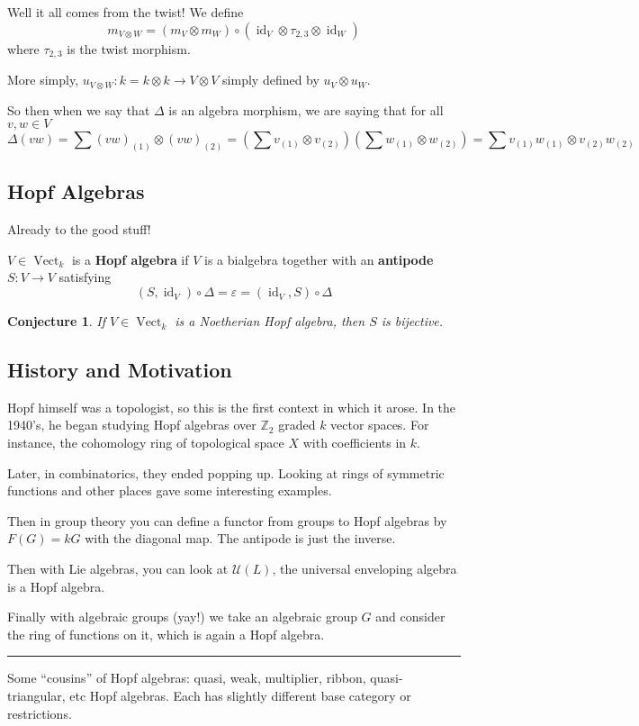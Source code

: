 \documentclass[12pt]{article}
\theoremstyle{break}
\theoremstyle{nonumberbreak}
\theoremstyle{changebreak}
\theoremstyle{break}
\theoremstyle{nonumberbreak}
\theoremstyle{nonumberplain}
\newtheorem{conj}{Conjecture}
\theoremstyle{change}
\newcommand*{\Z}{
\mathbb{Z}
}
\newcommand*{\brk}{
\rule{2in}{.1pt}
}
\DeclareMathOperator{\id}{id}
\newcommand*{\Vectk}{\operatorname{Vect}_k}
\begin{document}
Well it all comes from the twist! We define
\[m_{V\otimes W}=(m_V\otimes m_W)\circ(\id_V\otimes \tau_{2,3}\otimes \id_W)\]
where $\tau_{2,3}$ is the twist morphism.

More simply, $u_{V\otimes W}:k=k\otimes k\to V\otimes V$ simply defined by $u_V\otimes u_W$.

So then when we say that $\Delta$ is an algebra morphism, we are saying that for all $v,w\in V$
\[\Delta(vw)=\sum(vw)_{(1)}\otimes(vw)_{(2)}=(\sum v_{(1)}\otimes v_{(2)})(\sum w_{(1)}\otimes w_{(2)})=\sum v_{(1)}w_{(1)}\otimes v_{(2)}w_{(2)}\]

\subsection{Hopf Algebras}
Already to the good stuff!
\begin{defn}
	$V\in\Vectk$ is a \textbf{Hopf algebra} if $V$ is a bialgebra together with an \textbf{antipode}
	$S:V\to V$ satisfying
	\[(S,\id_V)\circ \Delta=\varepsilon=(\id_V,S)\circ\Delta\]
\end{defn}
\begin{conj}
	If $V\in\Vectk$ is a Noetherian Hopf algebra, then $S$ is bijective.
\end{conj}

\subsection{History and Motivation}
Hopf himself was a topologist, so this is the first context in which it arose. In the 1940's,
he began studying Hopf algebras over $\Z_2$ graded $k$ vector spaces. For instance, the 
cohomology ring of topological space $X$ with coefficients in $k$.

Later, in combinatorics, they ended popping up. Looking at rings of symmetric functions and other places
gave some interesting examples.

Then in group theory you can define a functor from groups to Hopf algebras by $F(G)=kG$
with the diagonal map. The antipode is just the inverse.

Then with Lie algebras, you can look at $\mathcal{U}(L)$, the universal enveloping algebra is a Hopf algebra.

Finally with algebraic groups (yay!) we take an algebraic group $G$ and consider the ring of functions on it, 
which is again a Hopf algebra.

\brk

Some ``cousins'' of Hopf algebras: quasi, weak, multiplier, ribbon, quasi-triangular, etc Hopf algebras. 
Each has slightly different base category or restrictions.
\end{document}
